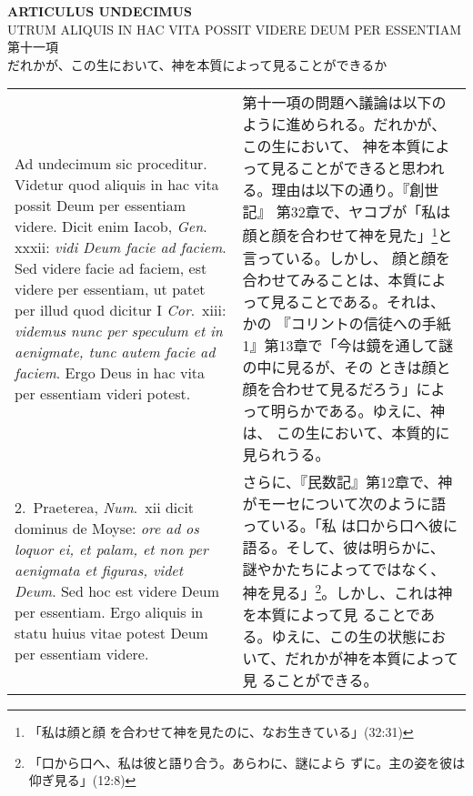 \documentclass[10pt]{jsarticle} %
\begin{document}
\newpage
{}

\begin{center}
 {\Large {\bf ARTICULUS UNDECIMUS}}\\
 {\large UTRUM ALIQUIS IN HAC VITA POSSIT VIDERE DEUM PER ESSENTIAM\\
第十一項\\
だれかが、この生において、神を本質によって見ることができるか}
\end{center}

\begin{longtable}{p{21em}p{21em}}

{\sc Ad undecimum sic proceditur}. Videtur quod aliquis in hac vita
possit Deum per essentiam videre. Dicit enim Iacob, {\it Gen}.~{\sc
xxxii}: {\it vidi Deum facie ad faciem}. Sed videre facie ad faciem,
est videre per essentiam, ut patet per illud quod dicitur I {\it
Cor}.~{\sc xiii}: {\it videmus nunc per speculum et in aenigmate, tunc
autem facie ad faciem}. Ergo Deus in hac vita per essentiam videri
potest.

&

第十一項の問題へ議論は以下のように進められる。だれかが、この生において、
神を本質によって見ることができると思われる。理由は以下の通り。『創世記』
第32章で、ヤコブが「私は顔と顔を合わせて神を見た」\footnote{「私は顔と顔
を合わせて神を見たのに、なお生きている」(32:31)}と言っている。しかし、
顔と顔を合わせてみることは、本質によって見ることである。それは、かの
『コリントの信徒への手紙1』第13章で「今は鏡を通して謎の中に見るが、その
ときは顔と顔を合わせて見るだろう」によって明らかである。ゆえに、神は、
この生において、本質的に見られうる。

\\

2.~{\sc Praeterea}, {\it Num}.~{\sc xii} dicit dominus de Moyse: {\it
 ore ad os loquor ei, et palam, et non per aenigmata et figuras, videt
 Deum}. Sed hoc est videre Deum per essentiam. Ergo aliquis in statu
 huius vitae potest Deum per essentiam videre.

&

さらに、『民数記』第12章で、神がモーセについて次のように語っている。「私
は口から口へ彼に語る。そして、彼は明らかに、謎やかたちによってではなく、
神を見る」\footnote{「口から口へ、私は彼と語り合う。あらわに、謎によら
ずに。主の姿を彼は仰ぎ見る」(12:8)}。しかし、これは神を本質によって見
ることである。ゆえに、この生の状態において、だれかが神を本質によって見
ることができる。

\\


\end{longtable}
\end{document}
